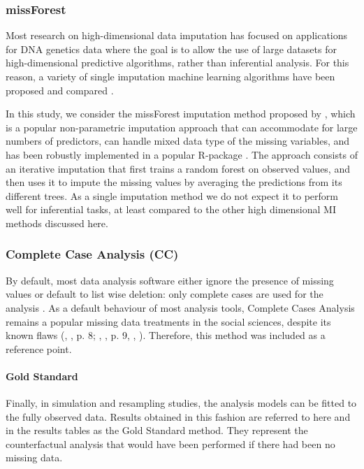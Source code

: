 \subsubsection{missForest}
	Most research on high-dimensional data imputation has focused on applications for DNA 
	genetics data where the goal is to allow the use of large datasets for high-dimensional
	predictive algorithms, rather than inferential analysis.
	For this reason, a variety of single imputation machine learning algorithms have been proposed
	and compared \citep{deAndradeSilvaHruschka:2009, stekhovenBuhlmann:2011}.

	In this study, we consider the missForest imputation method proposed by \cite{stekhovenBuhlmann:2011},
	which is a popular non-parametric imputation approach that can accommodate for large numbers of predictors, 
	can handle mixed data type of the missing variables, and has been robustly implemented in a popular 
	R-package \citep{missForest}.
	The approach consists of an iterative imputation that first trains a random forest on observed values, and then 
	uses it to impute the missing values by averaging the predictions from its different trees.
	As a single imputation method we do not expect it to perform well for inferential tasks, at least compared to 
	the other high dimensional MI methods discussed here.

\subsubsection{Complete Case Analysis (CC)}
	By default, most data analysis software either ignore the presence of missing values or default to list wise 
	deletion: only complete cases are used for the analysis \citep{R:2020, pandas:2020}.
	As a default behaviour of most analysis tools, Complete Cases Analysis remains a popular missing data treatments 
	in the social sciences, despite its known flaws (\citeauthor{rubin:1987}, \citeyear{rubin:1987}, p. 8; 
	\citeauthor{vanBuuren:2018}, \citeyear{vanBuuren:2018}, p. 9, \citeauthor{baraldiEnders:2010}, 
	\citeyear{baraldiEnders:2010}).
	Therefore, this method was included as a reference point.

\paragraph{Gold Standard}
	Finally, in simulation and resampling studies, the analysis models can be fitted to the fully observed data.
	Results obtained in this fashion are referred to here and in the results tables as the Gold Standard method.
	They represent the counterfactual analysis that would have been performed if there had been no missing data.
